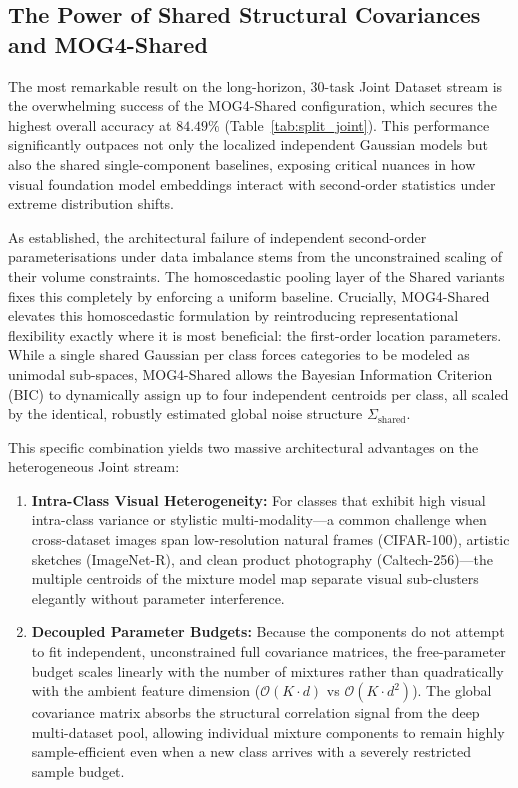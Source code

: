 \subsection{The Power of Shared Structural Covariances and MOG4-Shared}
\label{sec:an:shared_covariances}

The most remarkable result on the long-horizon, 30-task Joint Dataset stream is the overwhelming success of the MOG4-Shared configuration, which secures the highest overall accuracy at $84.49\%$ (Table~\ref{tab:split_joint}). This performance significantly outpaces not only the localized independent Gaussian models but also the shared single-component baselines, exposing critical nuances in how visual foundation model embeddings interact with second-order statistics under extreme distribution shifts.

As established, the architectural failure of independent second-order parameterisations under data imbalance stems from the unconstrained scaling of their volume constraints. The homoscedastic pooling layer of the Shared variants fixes this completely by enforcing a uniform baseline. Crucially, MOG4-Shared elevates this homoscedastic formulation by reintroducing representational flexibility exactly where it is most beneficial: the first-order location parameters. While a single shared Gaussian per class forces categories to be modeled as unimodal sub-spaces, MOG4-Shared allows the Bayesian Information Criterion (BIC) to dynamically assign up to four independent centroids per class, all scaled by the identical, robustly estimated global noise structure $\Sigma_{\text{shared}}$.

This specific combination yields two massive architectural advantages on the heterogeneous Joint stream:
\begin{enumerate}
	\item \textbf{Intra-Class Visual Heterogeneity:} For classes that exhibit high visual intra-class variance or stylistic multi-modality---a common challenge when cross-dataset images span low-resolution natural frames (CIFAR-100), artistic sketches (ImageNet-R), and clean product photography (Caltech-256)---the multiple centroids of the mixture model map separate visual sub-clusters elegantly without parameter interference.
	\item \textbf{Decoupled Parameter Budgets:} Because the components do not attempt to fit independent, unconstrained full covariance matrices, the free-parameter budget scales linearly with the number of mixtures rather than quadratically with the ambient feature dimension ($\mathcal{O}(K \cdot d)$ vs $\mathcal{O}(K \cdot d^2)$). The global covariance matrix absorbs the structural correlation signal from the deep multi-dataset pool, allowing individual mixture components to remain highly sample-efficient even when a new class arrives with a severely restricted sample budget.
\end{enumerate}

